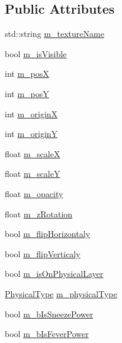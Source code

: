 \subsection*{Public Attributes}
\begin{DoxyCompactItemize}
\item 
std\-::string \hyperlink{struct_symp_1_1_meta_entity_a9b261edfae185b1a230f496055911359}{m\-\_\-texture\-Name}
\item 
bool \hyperlink{struct_symp_1_1_meta_entity_a330c05dfb269e00b4baac0e9471d388f}{m\-\_\-is\-Visible}
\item 
int \hyperlink{struct_symp_1_1_meta_entity_ae0682dbb5d1c67db0fcb0196d60682cb}{m\-\_\-pos\-X}
\item 
int \hyperlink{struct_symp_1_1_meta_entity_aca5081bf5b50d62fb653ca7a93b94649}{m\-\_\-pos\-Y}
\item 
int \hyperlink{struct_symp_1_1_meta_entity_a51906ceda9ebd508b87f275bf2506798}{m\-\_\-origin\-X}
\item 
int \hyperlink{struct_symp_1_1_meta_entity_a352306cd387c39390a027809a4508a83}{m\-\_\-origin\-Y}
\item 
float \hyperlink{struct_symp_1_1_meta_entity_aebe645a90fb39fd1abefa16335a504eb}{m\-\_\-scale\-X}
\item 
float \hyperlink{struct_symp_1_1_meta_entity_a7df7f1627cf970035c9f5b6490264094}{m\-\_\-scale\-Y}
\item 
float \hyperlink{struct_symp_1_1_meta_entity_ae32c33284b8ffabecb2c5358294d2cb4}{m\-\_\-opacity}
\item 
float \hyperlink{struct_symp_1_1_meta_entity_aa99614c3bf9787205f7e2d98695563e0}{m\-\_\-z\-Rotation}
\item 
bool \hyperlink{struct_symp_1_1_meta_entity_adb5c42f708d253e66adac60a5b8ceb8a}{m\-\_\-flip\-Horizontaly}
\item 
bool \hyperlink{struct_symp_1_1_meta_entity_a29aeeb45d00a16261d588aa2e1d40558}{m\-\_\-flip\-Verticaly}
\item 
bool \hyperlink{struct_symp_1_1_meta_entity_af3a8446adc01d502b3f7ae7a810d6bac}{m\-\_\-is\-On\-Physical\-Layer}
\item 
\hyperlink{namespace_symp_aebf0e58b2f3c80a5dfa3ddbe64ace7e5}{Physical\-Type} \hyperlink{struct_symp_1_1_meta_entity_adec983d933334ee27b5612ea6a67fa13}{m\-\_\-physical\-Type}
\item 
bool \hyperlink{struct_symp_1_1_meta_entity_abb18395677970e52429cff9fea1c3c49}{m\-\_\-b\-Is\-Sneeze\-Power}
\item 
bool \hyperlink{struct_symp_1_1_meta_entity_af1fee8807b58f1653e6f3588e575b7ff}{m\-\_\-b\-Is\-Fever\-Power}

\end{DoxyCompactItemize}
